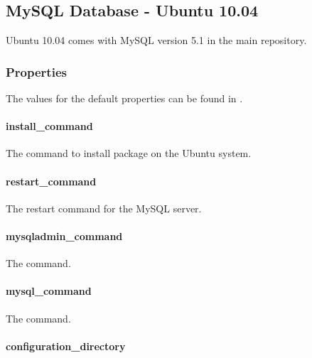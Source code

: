 \subsection{MySQL Database - Ubuntu 10.04}

Ubuntu 10.04 comes with MySQL version 5.1 in the main repository.

\subsubsection{Properties}

The values for the default properties can be found
in .

\paragraph{install\_command}


The command to install package on the Ubuntu system.

\paragraph{restart\_command}


The restart command for the MySQL server.

\paragraph{mysqladmin\_command}


The  command.

\paragraph{mysql\_command}


The  command.

\paragraph{configuration\_directory}

